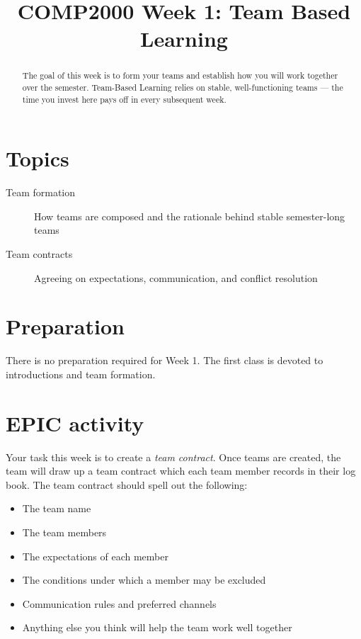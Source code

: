 \documentclass[twoside=false,DIV=14]{scrartcl}
\title{\color{redish} \vspace{-1em}COMP2000 Week 1: Team Based Learning}
\begin{document}
{\color{blackish}\maketitle}\vspace{-7em}

\begin{abstract}
The goal of this week is to form your teams and establish how you will work together over the semester.  Team-Based Learning relies on stable, well-functioning teams --- the time you invest here pays off in every subsequent week.
\end{abstract}

\section*{Topics}
\begin{description}
\item[Team formation] How teams are composed and the rationale behind stable semester-long teams
\item[Team contracts] Agreeing on expectations, communication, and conflict resolution
\end{description}

\section*{Preparation}
There is no preparation required for Week 1.  The first class is devoted to introductions and team formation.


\section*{EPIC activity}

Your task this week is to create a \emph{team contract}.  Once teams are created, the team will draw up a team contract which each team member records in their log book.  The team contract should spell out the following:
\begin{itemize}
\itemsep0em
\item The team name
\item The team members
\item The expectations of each member
\item The conditions under which a member may be excluded
\item Communication rules and preferred channels
\item Anything else you think will help the team work well together
\end{itemize}
\end{document}
